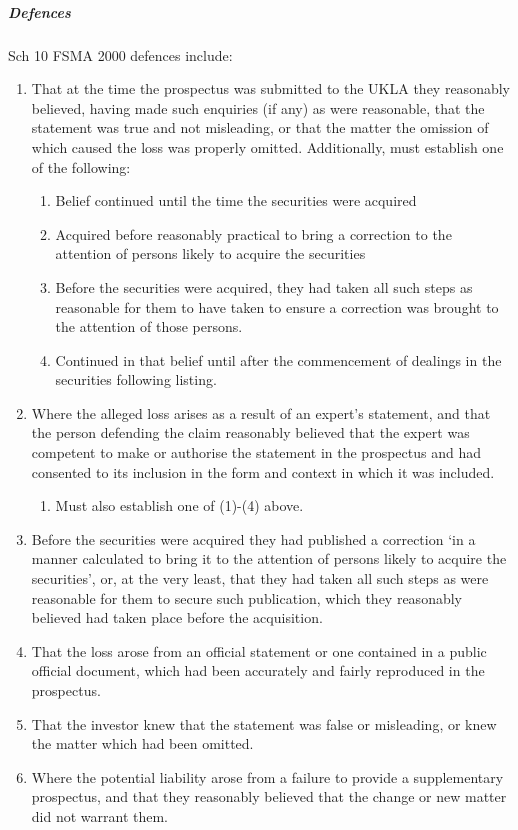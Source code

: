 \documentclass[
]{article}
\providecommand{\tightlist}{%
  \setlength{\itemsep}{0pt}\setlength{\parskip}{0pt}}
\begin{document}
\hypertarget{defences}{%
\subparagraph{Defences}\label{defences}}

Sch 10 FSMA 2000 defences include:

\begin{enumerate}
\tightlist
\item
  That at the time the prospectus was submitted to the UKLA they
  reasonably believed, having made such enquiries (if any) as were
  reasonable, that the statement was true and not misleading, or that
  the matter the omission of which caused the loss was properly omitted.
  Additionally, must establish one of the following:

  \begin{enumerate}
  \tightlist
  \item
    Belief continued until the time the securities were acquired
  \item
    Acquired before reasonably practical to bring a correction to the
    attention of persons likely to acquire the securities
  \item
    Before the securities were acquired, they had taken all such steps
    as reasonable for them to have taken to ensure a correction was
    brought to the attention of those persons.
  \item
    Continued in that belief until after the commencement of dealings in
    the securities following listing.
  \end{enumerate}
\item
  Where the alleged loss arises as a result of an expert's statement,
  and that the person defending the claim reasonably believed that the
  expert was competent to make or authorise the statement in the
  prospectus and had consented to its inclusion in the form and context
  in which it was included.

  \begin{enumerate}
  \tightlist
  \item
    Must also establish one of (1)-(4) above.
  \end{enumerate}
\item
  Before the securities were acquired they had published a correction
  `in a manner calculated to bring it to the attention of persons likely
  to acquire the securities', or, at the very least, that they had taken
  all such steps as were reasonable for them to secure such publication,
  which they reasonably believed had taken place before the acquisition.
\item
  That the loss arose from an official statement or one contained in a
  public official document, which had been accurately and fairly
  reproduced in the prospectus.
\item
  That the investor knew that the statement was false or misleading, or
  knew the matter which had been omitted.
\item
  Where the potential liability arose from a failure to provide a
  supplementary prospectus, and that they reasonably believed that the
  change or new matter did not warrant them.
\end{enumerate}
\end{document}
